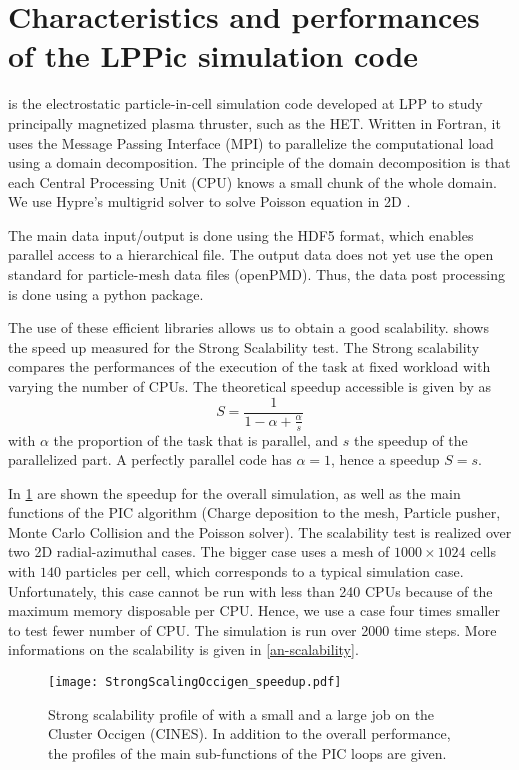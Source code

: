 

\section{Characteristics and performances of the LPPic simulation code }
\label{sec-lppic}


\LPPic is the electrostatic particle-in-cell simulation code developed at \ac{LPP} to study principally magnetized plasma thruster, such as the \ac{HET}.
Written in Fortran, it uses the Message Passing Interface (MPI) to parallelize the computational load using a domain decomposition.
The principle of the domain decomposition is that each Central Processing Unit (CPU) knows a small chunk of the whole domain.
We use {\sc Hypre}'s multigrid solver to solve Poisson equation in \ac{2D} \citep{falgout2002}.

The main data input/output is done using the HDF5 format, which enables parallel access to a hierarchical file.
The output data does not yet use the open standard for particle-mesh data files (openPMD).
Thus, the data post processing is done using a python package.

The use of these efficient libraries allows us to obtain a good scalability.
 shows the speed up measured for the Strong Scalability test.
The Strong scalability compares the performances of the execution of the task at fixed workload with varying the number of CPUs.
The theoretical speedup accessible is given by \citet{amdahl1967} as
\begin{equation} \label{eq-amdahl}
  S = \frac{1}{1 - \alpha + \frac{\alpha}{s}}
\end{equation}
with $\alpha$ the proportion of the task that is parallel, and $s$ the speedup of the parallelized part.
A perfectly parallel code has $\alpha=1$, hence a speedup $S=s$.

In \cref{fig-strongperfo} are shown the speedup for the overall simulation, as well as the main functions of the \ac{PIC} algorithm (Charge deposition to the mesh, Particle pusher, Monte Carlo Collision and the Poisson solver).
The scalability test is realized over two \ac{2D} radial-azimuthal cases. 
The bigger case uses a mesh of $1000\times1024$ cells with $140$ particles per cell, which corresponds to a typical simulation case.
Unfortunately, this case cannot be run with less than 240 CPUs because of the maximum memory disposable per CPU. 
Hence, we use a case four times smaller to test fewer number of CPU.
The simulation is run over 2000 time steps.
More informations on the scalability is given in \cref{an-scalability}.
\begin{figure}[hbt]
  \centering
  \texttt{[image: StrongScalingOccigen\_speedup.pdf]}
  \caption{Strong scalability profile of \LPPic with a small and a large job on the Cluster Occigen (CINES). In addition to the overall performance, the profiles of the main sub-functions of the \acs{PIC} loops are given. }
  \label{fig-strongperfo}
\end{figure}


